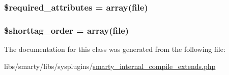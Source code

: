 \subsubsection[{\$required\+\_\+attributes}]{\setlength{\rightskip}{0pt plus 5cm}\$required\+\_\+attributes = array(\textquotesingle{}file\textquotesingle{})}\label{class_smarty___internal___compile___extends_ae799507d5461de485f3a618abeecea95}
\hypertarget{class_smarty___internal___compile___extends_a2ccb25269c3a92e8c4796c7ef23725e6}{}
\subsubsection[{\$shorttag\+\_\+order}]{\setlength{\rightskip}{0pt plus 5cm}\$shorttag\+\_\+order = array(\textquotesingle{}file\textquotesingle{})}\label{class_smarty___internal___compile___extends_a2ccb25269c3a92e8c4796c7ef23725e6}


The documentation for this class was generated from the following file\+:\begin{DoxyCompactItemize}
\item 
libs/smarty/libs/sysplugins/\hyperlink{smarty__internal__compile__extends_8php}{smarty\+\_\+internal\+\_\+compile\+\_\+extends.\+php}\end{DoxyCompactItemize}

